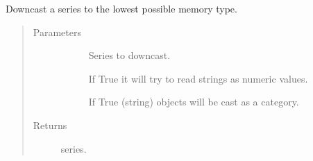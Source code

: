 \documentclass[letterpaper,10pt,english]{sphinxmanual}
\begin{document}
\begin{fulllineitems}
\label{\detokenize{autoapi/src/utils/preprocess/index:src.utils.preprocess.downcast}}
Downcast  a series to the lowest possible memory type.
\begin{quote}\begin{description}
\item[{Parameters}] \leavevmode\begin{description}
\item[{}] \leavevmode{[}\sphinxcode{\sphinxupquote{pd.Series}}{]}
Series to downcast.

\item[{}] \leavevmode
If True it will try to read strings as numeric values.

\item[{}] \leavevmode
If True (string) objects will be cast as a category.

\end{description}

\item[{Returns}] \leavevmode\begin{description}
\item[{ series.}] \leavevmode
\end{description}

\end{description}\end{quote}

\end{fulllineitems}

\end{document}
